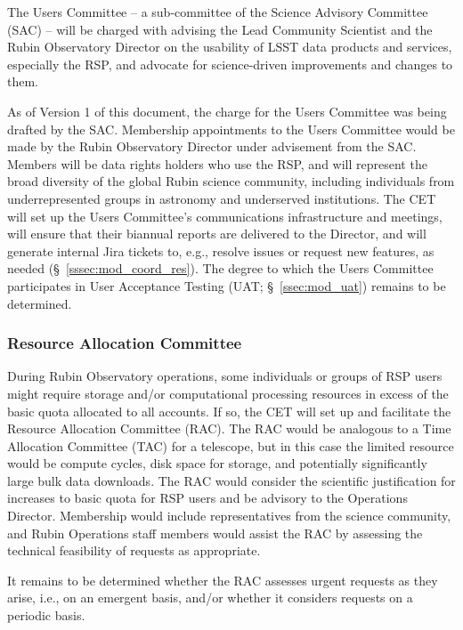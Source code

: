 \documentclass[DM,lsstdraft,toc]{lsstdoc}
\begin{document}
The Users Committee -- a sub-committee of the Science Advisory Committee (SAC) -- will be charged with advising the Lead Community Scientist and the Rubin Observatory Director on the usability of LSST data products and services, especially the RSP, and advocate for science-driven improvements and changes to them.

As of Version 1 of this document, the charge for the Users Committee was being drafted by the SAC.
Membership appointments to the Users Committee would be made by the Rubin Observatory Director under advisement from the SAC.
Members will be data rights holders who use the RSP, and will represent the broad diversity of the global Rubin science community, including individuals from underrepresented groups in astronomy and underserved institutions.
The CET will set up the Users Committee's communications infrastructure and meetings, will ensure that their biannual reports are delivered to the Director, and will generate internal Jira tickets to, e.g., resolve issues or request new features, as needed (\S~\ref{sssec:mod_coord_res}).
The degree to which the Users Committee participates in User Acceptance Testing (UAT; \S~\ref{ssec:mod_uat}) remains to be determined.


\subsubsection{Resource Allocation Committee}\label{sssec:mod_coord_rac}

During Rubin Observatory operations, some individuals or groups of RSP users might require storage and/or computational processing resources in excess of the basic quota allocated to all accounts.
If so, the CET will set up and facilitate the Resource Allocation Committee (RAC).
The RAC would be analogous to a Time Allocation Committee (TAC) for a telescope, but in this case the limited resource would be compute cycles, disk space for storage, and potentially significantly large bulk data downloads.
The RAC would consider the scientific justification for increases to basic quota for RSP users and be advisory to the Operations Director.
Membership would include representatives from the science community, and Rubin Operations staff members would assist the RAC by assessing the technical feasibility of requests as appropriate.

It remains to be determined whether the RAC assesses urgent requests as they arise, i.e., on an emergent basis, and/or whether it considers requests on a periodic basis.
\end{document}
